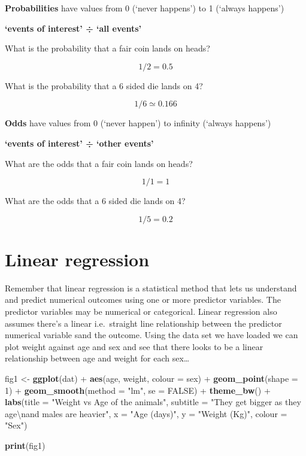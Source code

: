 \documentclass[]{tufte-handout}
\newenvironment{Shaded}{}{}
\newcommand{\CharTok}[1]{\textcolor[rgb]{0.25,0.44,0.63}{#1}}
\newcommand{\DataTypeTok}[1]{\textcolor[rgb]{0.56,0.13,0.00}{#1}}
\newcommand{\DecValTok}[1]{\textcolor[rgb]{0.25,0.63,0.44}{#1}}
\newcommand{\KeywordTok}[1]{\textcolor[rgb]{0.00,0.44,0.13}{\textbf{#1}}}
\newcommand{\NormalTok}[1]{#1}
\newcommand{\OperatorTok}[1]{\textcolor[rgb]{0.40,0.40,0.40}{#1}}
\newcommand{\OtherTok}[1]{\textcolor[rgb]{0.00,0.44,0.13}{#1}}
\newcommand{\StringTok}[1]{\textcolor[rgb]{0.25,0.44,0.63}{#1}}
\begin{document}
\textbf{Probabilities} have values from 0 (`never happens') to 1
(`always happens')

\textbf{`events of interest' ÷ `all events'}

What is the probability that a fair coin lands on heads?

\[1/2 = 0.5\]

What is the probability that a 6 sided die lands on 4?

\[1/6 \simeq 0.166\]

\textbf{Odds} have values from 0 (`never happen') to infinity (`always
happens')

\textbf{`events of interest' ÷ `other events'}

What are the odds that a fair coin lands on heads?

\[1/1 = 1\]

What are the odds that a 6 sided die lands on 4?

\[1/5 = 0.2\]

\newpage

\hypertarget{linear-regression}{%
\section{Linear regression}\label{linear-regression}}

Remember that linear regression is a statistical method that lets us
understand and predict numerical outcomes using one or more predictor
variables. The predictor variables may be numerical or categorical.
Linear regression also assumes there's a linear i.e.~straight line
relationship between the predictor numerical variable sand the outcome.
Using the data set we have loaded we can plot weight against age and sex
and see that there looks to be a linear relationship between age and
weight for each sex\ldots{}

\begin{Shaded}
\begin{Highlighting}[]
\NormalTok{fig1 <-}\StringTok{ }\KeywordTok{ggplot}\NormalTok{(dat) }\OperatorTok{+}\StringTok{ }\KeywordTok{aes}\NormalTok{(age, weight, }\DataTypeTok{colour =}\NormalTok{ sex) }\OperatorTok{+}\StringTok{ }
\StringTok{    }\KeywordTok{geom_point}\NormalTok{(}\DataTypeTok{shape =} \DecValTok{1}\NormalTok{) }\OperatorTok{+}\StringTok{ }\KeywordTok{geom_smooth}\NormalTok{(}\DataTypeTok{method =} \StringTok{"lm"}\NormalTok{, }
    \DataTypeTok{se =} \OtherTok{FALSE}\NormalTok{) }\OperatorTok{+}\StringTok{ }\KeywordTok{theme_bw}\NormalTok{() }\OperatorTok{+}\StringTok{ }\KeywordTok{labs}\NormalTok{(}\DataTypeTok{title =} \StringTok{"Weight vs Age of the animals"}\NormalTok{, }
    \DataTypeTok{subtitle =} \StringTok{"They get bigger as they age}\CharTok{\textbackslash{}n}\StringTok{and males are heavier"}\NormalTok{, }
    \DataTypeTok{x =} \StringTok{"Age (days)"}\NormalTok{, }\DataTypeTok{y =} \StringTok{"Weight (Kg)"}\NormalTok{, }\DataTypeTok{colour =} \StringTok{"Sex"}\NormalTok{)}

\KeywordTok{print}\NormalTok{(fig1)}
\end{Highlighting}
\end{Shaded}
\end{document}
